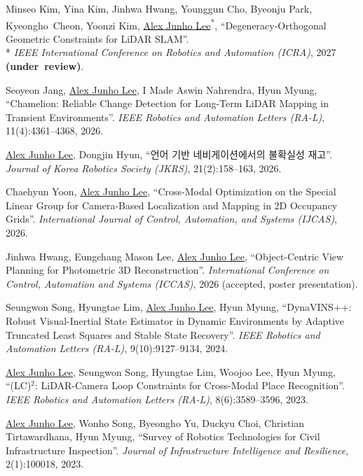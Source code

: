 \documentclass[margin]{res}
\begin{document}
\begin{resume}
		\par Minseo Kim, Yina Kim, Jinhwa Hwang, Younggun Cho, Byeonju Park, Kyeongho~Cheon, Yoonzi Kim, \underline{Alex Junho Lee}\textsuperscript{*}, ``Degeneracy-Orthogonal Geometric Constraints for LiDAR SLAM''.\\*
		\textit{IEEE International Conference on Robotics and Automation (ICRA)}, 2027 \mbox{\textbf{(under review)}}.

		\par Seoyeon Jang, \underline{Alex Junho Lee}, I Made Aswin Nahrendra, Hyun Myung, ``Chamelion: Reliable Change Detection for Long-Term LiDAR Mapping in Transient Environments''. \textit{IEEE Robotics and Automation Letters (RA-L)}, 11(4):4361--4368, 2026.

		\par\underline{Alex Junho Lee}, Dongjin Hyun, ``언어 기반 네비게이션에서의 불확실성 재고''. \textit{Journal of Korea Robotics Society (JKRS)}, 21(2):158--163, 2026.

		\par Chaehyun Yoon, \underline{Alex Junho Lee}, ``Cross-Modal Optimization on the Special Linear Group for Camera-Based Localization and Mapping in 2D Occupancy Grids''. \textit{International Journal of Control, Automation, and Systems (IJCAS)}, 2026.

		\par Jinhwa Hwang, Eungchang Mason Lee, \underline{Alex Junho Lee}, ``Object-Centric View Planning for Photometric 3D Reconstruction''. \textit{International Conference on Control, Automation and Systems (ICCAS)}, 2026 (accepted, poster presentation).

		\par Seungwon Song, Hyungtae Lim, \underline{Alex Junho Lee}, Hyun Myung, ``DynaVINS++: Robust Visual-Inertial State Estimator in Dynamic Environments by Adaptive Truncated Least Squares and Stable State Recovery''. \textit{IEEE Robotics and Automation Letters (RA-L)}, 9(10):9127--9134, 2024.

		\par\underline{Alex Junho Lee}, Seungwon Song, Hyungtae Lim, Woojoo Lee, Hyun Myung, ``(LC)$^2$: LiDAR-Camera Loop Constraints for Cross-Modal Place Recognition''. \textit{IEEE Robotics and Automation Letters (RA-L)}, 8(6):3589--3596, 2023.

		\par\underline{Alex Junho Lee}, Wonho Song, Byeongho Yu, Duckyu Choi, Christian Tirtawardhana, Hyun Myung, ``Survey of Robotics Technologies for Civil Infrastructure Inspection''. \textit{Journal of Infrastructure Intelligence and Resilience}, 2(1):100018, 2023.


\end{resume}
\end{document}
